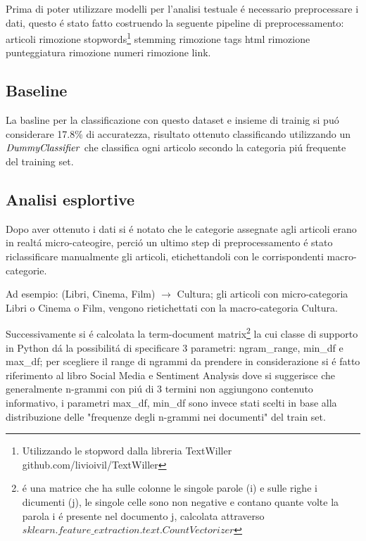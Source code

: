 \documentclass[runningheads]{llncs}
\begin{document}
Prima di poter utilizzare modelli per l'analisi testuale \'e necessario preprocessare i dati,
questo \'e stato fatto costruendo la seguente pipeline di preprocessamento: articoli \textpipe  rimozione stopwords\footnote{Utilizzando le stopword dalla libreria TextWiller github.com/livioivil/TextWiller} \textpipe  stemming \textpipe rimozione tags html \textpipe rimozione punteggiatura \textpipe rimozione numeri \textpipe rimozione link.


\subsection{Baseline}
\label{sec:baseline}

La basline per la classificazione con questo dataset e insieme di trainig si pu\'o considerare 17.8\% di accuratezza, risultato ottenuto classificando utilizzando un $\it DummyClassifier$ che classifica ogni articolo secondo la categoria pi\'u frequente del training set.


\subsection{Analisi esplortive}
Dopo aver ottenuto i dati si \'e notato che le categorie assegnate agli articoli erano in realt\'a micro-cateogire, perci\'o un ultimo step
di preprocessamento \'e stato riclassificare manualmente gli articoli, etichettandoli con le corrispondenti macro-categorie.

Ad esempio:  (Libri, Cinema, Film) $\rightarrow $ Cultura; gli articoli con micro-categoria Libri o Cinema o Film, vengono rietichettati con la macro-categoria Cultura.

Successivamente si \'e calcolata la term-document matrix\footnote{\'e una matrice che ha sulle colonne le singole parole (i) e sulle righe i dicumenti (j), le singole celle sono non negative e contano quante volte la parola i \'e presente nel documento j, calcolata attraverso    $sklearn.feature\_extraction.text.CountVectorizer$}  la cui classe di supporto in Python d\'a la possibilit\'a di specificare 3 parametri: ngram\_range, min\_df e max\_df; per scegliere il
range di ngrammi da prendere in considerazione si \'e fatto riferimento al libro Social Media e Sentiment Analysis\cite{NGRAM} dove si suggerisce che generalmente n-grammi con pi\'u di 3 termini non aggiungono contenuto informativo, i parametri max\_df, min\_df sono invece stati scelti in base alla distribuzione delle "frequenze degli n-grammi nei documenti" del train set.
\end{document}
